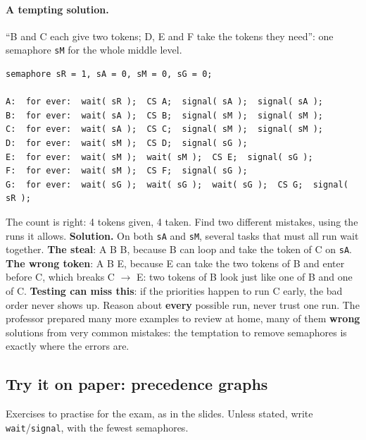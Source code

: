 \paragraph{A tempting solution.} ``B and C each give two tokens; D, E and F take the tokens they need'': one semaphore \texttt{sM} for the whole middle level.
\begin{lstlisting}[basicstyle=\ttfamily\footnotesize]
semaphore sR = 1, sA = 0, sM = 0, sG = 0;

A:  for ever:  wait( sR );  CS A;  signal( sA );  signal( sA );
B:  for ever:  wait( sA );  CS B;  signal( sM );  signal( sM );
C:  for ever:  wait( sA );  CS C;  signal( sM );  signal( sM );
D:  for ever:  wait( sM );  CS D;  signal( sG );
E:  for ever:  wait( sM );  wait( sM );  CS E;  signal( sG );
F:  for ever:  wait( sM );  CS F;  signal( sG );
G:  for ever:  wait( sG );  wait( sG );  wait( sG );  CS G;  signal( sR );
\end{lstlisting}
The count is right: 4 tokens given, 4 taken. Find two different mistakes, using the runs it allows.
\textbf{Solution.} On both \texttt{sA} and \texttt{sM}, several tasks that must all run wait together. \textbf{The steal}: A B B, because B can loop and take the token of C on \texttt{sA}. \textbf{The wrong token}: A B E, because E can take the two tokens of B and enter before C, which breaks C $\rightarrow$ E: two tokens of B look just like one of B and one of C. \textbf{Testing can miss this}: if the priorities happen to run C early, the bad order never shows up. Reason about \textbf{every} possible run, never trust one run. The professor prepared many more examples to review at home, many of them \textbf{wrong} solutions from very common mistakes: the temptation to remove semaphores is exactly where the errors are.

\subsection{Try it on paper: precedence graphs}
Exercises to practise for the exam, as in the slides. Unless stated, write \texttt{wait}/\texttt{signal}, with the fewest semaphores.


